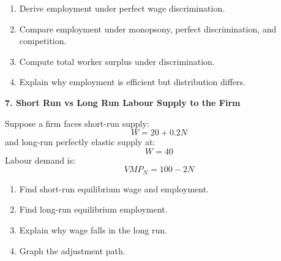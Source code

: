 \documentclass[12pt]{article}
\begin{document}
\begin{enumerate}
\item[(a)] Derive employment under perfect wage discrimination.
\item[(b)] Compare employment under monopsony, perfect discrimination, and competition.
\item[(c)] Compute total worker surplus under discrimination.
\item[(d)] Explain why employment is efficient but distribution differs.
\end{enumerate}


\vspace{1em}

\textbf{7. Short Run vs Long Run Labour Supply to the Firm}

Suppose a firm faces short-run supply:
\[
W = 20 + 0.2N
\]
and long-run perfectly elastic supply at:
\[
W = 40
\]
Labour demand is:
\[
VMP_N = 100 - 2N
\]

\begin{enumerate}
\item[(a)] Find short-run equilibrium wage and employment.
\item[(b)] Find long-run equilibrium employment.
\item[(c)] Explain why wage falls in the long run.
\item[(d)] Graph the adjustment path.
\end{enumerate}
\end{document}
